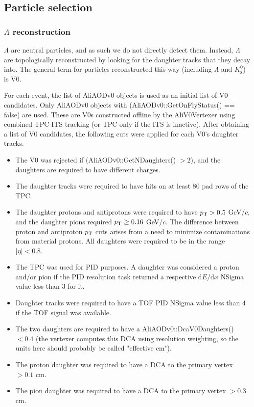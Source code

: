 \subsection{Particle selection}
\label{sec:ParticleSelection}


\subsubsection{\texorpdfstring{$\Lambda$}{Lambda} reconstruction}
\label{sec:Recon}

$\Lambda$ are neutral particles, and as such we do not directly detect them.  
Instead, $\Lambda$ are topologically reconstructed by looking for the daughter tracks that they decay into.  
The general term for particles reconstructed this way (including $\bar{\Lambda}$ and $K^0_\mathrm{s}$) is V0.

For each event, the list of AliAODv0 objects is used as an initial list of V0 candidates.  
Only AliAODv0 objects with (AliAODv0::GetOnFlyStatus() == false) are used.  
These are V0s constructed offline by the AliV0Vertexer using combined TPC-ITS tracking (or TPC-only if the ITS is inactive).  
After obtaining a list of V0 candidates, the following cuts were applied for each V0's daughter tracks.

\begin{itemize}
\item The V0 was rejected if (AliAODv0::GetNDaughters() $> 2$), and the daughters are required to have different charges.
\item The daughter tracks were required to have hits on at least 80 pad rows of the TPC.
\item The daughter protons and antiprotons were required to have $p_{\rm T} > 0.5$ GeV/$c$, and the daughter pions required $p_{\rm T} \geq 0.16$ GeV/$c$. 
The difference between proton and antiproton $p_{\rm T}$ cuts arises from a need to minimize contaminations from material protons. 
All daughters were required to be in the range $|\eta| < 0.8$.
\item The TPC was used for PID purposes.  
A daughter was considered a proton and/or pion if the PID resolution task returned a respective $\mathrm{d}E/\mathrm{d}x$ NSigma value less than 3 for it.
\item Daughter tracks were required to have a TOF PID NSigma value less than 4 if the TOF signal was available.
\item The two daughters are required to have a AliAODv0::DcaV0Daughters() $< 0.4$ (the vertexer computes this DCA using resolution weighting, so the units here should probably be called "effective cm").
\item The proton daughter was required to have a DCA to the primary vertex $> 0.1$ cm.
\item The pion daughter was required to have a DCA to the primary vertex $> 0.3$ cm.
\end{itemize}

